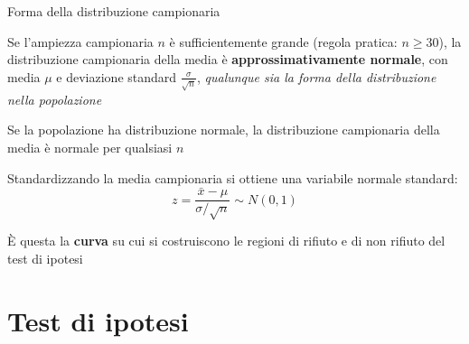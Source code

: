 \documentclass[
  ignorenonframetext,
  compress, aspectratio=149]{beamer}
\begin{document}
\begin{frame}{Forma della distribuzione campionaria}
\label{forma-della-distribuzione-campionaria}
\footnotesize

\begin{tcolorbox}[enhanced jigsaw, opacityback=0, bottomtitle=1mm, bottomrule=.15mm, titlerule=0mm, coltitle=black, toprule=.15mm, breakable, toptitle=1mm, colbacktitle=quarto-callout-important-color!10!white, arc=.35mm, title={Teorema del limite centrale}, rightrule=.15mm, leftrule=.75mm, opacitybacktitle=0.6, left=2mm, colframe=quarto-callout-important-color-frame, colback=white]

Se l'ampiezza campionaria \(n\) è sufficientemente grande (regola
pratica: \(n \geq 30\)), la distribuzione campionaria della media è
\textbf{approssimativamente normale}, con media \(\mu\) e deviazione
standard \(\frac{\sigma}{\sqrt{n}}\), \emph{qualunque sia la forma della
distribuzione nella popolazione}

\end{tcolorbox}

Se la popolazione ha distribuzione normale, la distribuzione campionaria
della media è normale per qualsiasi \(n\)

\vspace{2mm}

Standardizzando la media campionaria si ottiene una variabile normale
standard: \[z = \frac{\bar{x} - \mu}{\sigma / \sqrt{n}} \sim N(0, 1)\]

È questa la \textbf{curva} su cui si costruiscono le regioni di rifiuto
e di non rifiuto del test di ipotesi
\end{frame}

\section{Test di ipotesi}\label{test-di-ipotesi}
\end{document}
